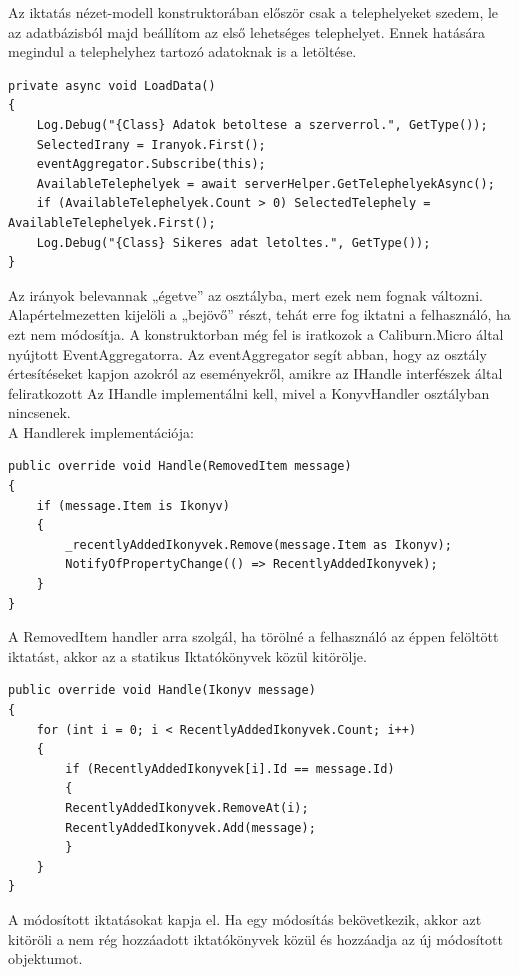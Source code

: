 \documentclass[
]{thesis-ekf}
\theoremstyle{definition}
\theoremstyle{remark}
\begin{document}
Az iktatás nézet-modell konstruktorában először csak a telephelyeket szedem, le az adatbázisból majd beállítom az első lehetséges telephelyet. Ennek hatására megindul a telephelyhez tartozó adatoknak is a letöltése. 
\begin{lstlisting}[showstringspaces=false,caption={Iktatáshoz szükséges adatok letöltése.},captionpos=b]
private async void LoadData()
{
	Log.Debug("{Class} Adatok betoltese a szerverrol.", GetType());
	SelectedIrany = Iranyok.First();
	eventAggregator.Subscribe(this);
	AvailableTelephelyek = await serverHelper.GetTelephelyekAsync();
	if (AvailableTelephelyek.Count > 0) SelectedTelephely = AvailableTelephelyek.First();
	Log.Debug("{Class} Sikeres adat letoltes.", GetType());
}
\end{lstlisting}
Az irányok belevannak „égetve” az osztályba, mert ezek nem fognak változni. Alapértelmezetten kijelöli a „bejövő” részt, tehát erre fog iktatni a felhasználó, ha ezt nem módosítja. A konstruktorban még fel is iratkozok a Caliburn.Micro által nyújtott EventAggregatorra. Az eventAggregator segít abban, hogy az osztály értesítéseket kapjon azokról az eseményekről, amikre az IHandle interfészek által feliratkozott Az IHandle implementálni kell, mivel a KonyvHandler osztályban nincsenek.\\
A Handlerek implementációja:
\begin{lstlisting}[caption={Iktatás törlése a táblából.},captionpos=b]
public override void Handle(RemovedItem message)
{
	if (message.Item is Ikonyv)
	{
		_recentlyAddedIkonyvek.Remove(message.Item as Ikonyv);
		NotifyOfPropertyChange(() => RecentlyAddedIkonyvek);
	}
}
\end{lstlisting}
A RemovedItem handler arra szolgál, ha törölné a felhasználó az éppen felöltött iktatást, akkor az a statikus Iktatókönyvek közül kitörölje. 
\begin{lstlisting}[caption={Iktatás módosítása a táblában.},captionpos=b]
public override void Handle(Ikonyv message)
{
	for (int i = 0; i < RecentlyAddedIkonyvek.Count; i++)
	{
		if (RecentlyAddedIkonyvek[i].Id == message.Id)
		{
		RecentlyAddedIkonyvek.RemoveAt(i);
		RecentlyAddedIkonyvek.Add(message);
		}
	}
}

\end{lstlisting}
A módosított iktatásokat kapja el. Ha egy módosítás bekövetkezik, akkor azt kitöröli a nem rég hozzáadott iktatókönyvek közül és hozzáadja az új módosított objektumot.
\end{document}

